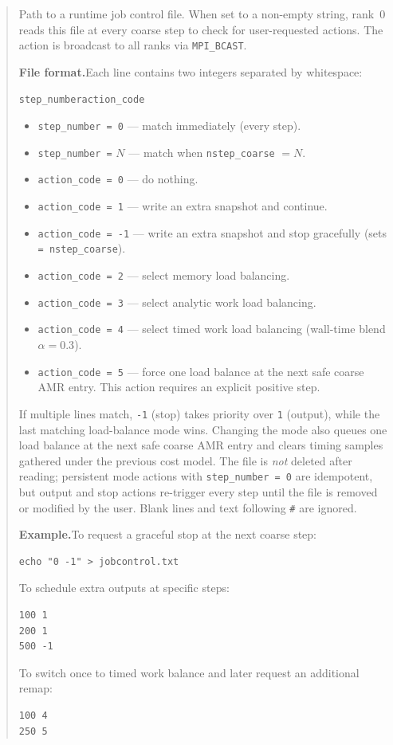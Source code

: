 \begin{quote}
Path to a runtime job control file.  When set to a non-empty string,
rank~0 reads this file at every coarse step to check for user-requested
actions.  The action is broadcast to all ranks via \texttt{MPI\_BCAST}.

\textbf{File format.}\quad  Each line contains two integers separated by
whitespace:
\begin{center}
\texttt{step\_number\quad action\_code}
\end{center}
\begin{itemize}[nosep]
  \item \texttt{step\_number = 0} --- match immediately (every step).
  \item \texttt{step\_number =} $N$ --- match when
        \texttt{nstep\_coarse} $= N$.
  \item \texttt{action\_code = 0} --- do nothing.
  \item \texttt{action\_code = 1} --- write an extra snapshot and continue.
  \item \texttt{action\_code = -1} --- write an extra snapshot and stop
        gracefully (sets \texttt{= nstep\_coarse}).
  \item \texttt{action\_code = 2} --- select memory load balancing.
  \item \texttt{action\_code = 3} --- select analytic work load balancing.
  \item \texttt{action\_code = 4} --- select timed work load balancing
        (wall-time blend $\alpha=0.3$).
  \item \texttt{action\_code = 5} --- force one load balance at the next safe
        coarse AMR entry.  This action requires an explicit positive step.
\end{itemize}
If multiple lines match, \texttt{-1} (stop) takes priority over
\texttt{1} (output), while the last matching load-balance mode wins.
Changing the mode also queues one load balance at the next safe coarse AMR
entry and clears timing samples gathered under the previous cost model.
The file is \emph{not} deleted after reading; persistent mode actions with
\texttt{step\_number = 0} are idempotent, but output and stop actions
re-trigger every step until the file is removed or modified by the user.
Blank lines and text following \texttt{\#} are ignored.

\textbf{Example.}\quad  To request a graceful stop at the next coarse step:
\begin{verbatim}
echo "0 -1" > jobcontrol.txt
\end{verbatim}
To schedule extra outputs at specific steps:
\begin{verbatim}
100 1
200 1
500 -1
\end{verbatim}
To switch once to timed work balance and later request an additional remap:
\begin{verbatim}
100 4
250 5
\end{verbatim}

\end{quote}


